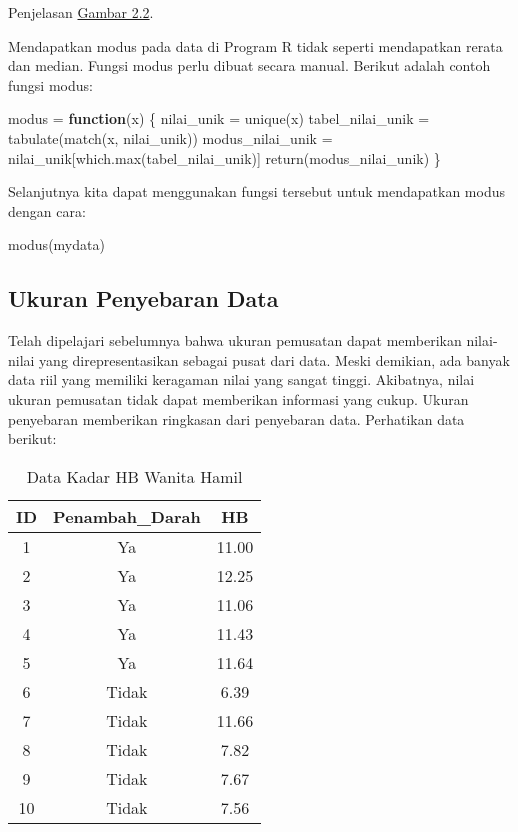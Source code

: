 \documentclass[
]{book}
\newenvironment{Shaded}{\begin{snugshade}}{\end{snugshade}}
\newcommand{\ControlFlowTok}[1]{\textcolor[rgb]{0.13,0.29,0.53}{\textbf{#1}}}
\newcommand{\FunctionTok}[1]{\textcolor[rgb]{0.00,0.00,0.00}{#1}}
\newcommand{\NormalTok}[1]{#1}
\newcommand{\OtherTok}[1]{\textcolor[rgb]{0.56,0.35,0.01}{#1}}
\begin{document}
Penjelasan \href{fig:a2-fig2}{Gambar 2.2}.

Mendapatkan modus pada data di Program R tidak seperti mendapatkan rerata dan median. Fungsi modus perlu dibuat secara manual. Berikut adalah contoh fungsi modus:

\begin{Shaded}
\begin{Highlighting}[]
\NormalTok{modus }\OtherTok{=} \ControlFlowTok{function}\NormalTok{(x) \{}
\NormalTok{  nilai\_unik }\OtherTok{=} \FunctionTok{unique}\NormalTok{(x)}
\NormalTok{  tabel\_nilai\_unik }\OtherTok{=} \FunctionTok{tabulate}\NormalTok{(}\FunctionTok{match}\NormalTok{(x, nilai\_unik))}
\NormalTok{  modus\_nilai\_unik }\OtherTok{=}\NormalTok{ nilai\_unik[}\FunctionTok{which.max}\NormalTok{(tabel\_nilai\_unik)]}
  \FunctionTok{return}\NormalTok{(modus\_nilai\_unik)}
\NormalTok{\}}
\end{Highlighting}
\end{Shaded}

Selanjutnya kita dapat menggunakan fungsi tersebut untuk mendapatkan modus dengan cara:

\begin{Shaded}
\begin{Highlighting}[]
\FunctionTok{modus}\NormalTok{(mydata)}
\end{Highlighting}
\end{Shaded}

\hypertarget{ukuran-penyebaran-data}{%
\subsection{Ukuran Penyebaran Data}\label{ukuran-penyebaran-data}}

Telah dipelajari sebelumnya bahwa ukuran pemusatan dapat memberikan nilai-nilai yang direpresentasikan sebagai pusat dari data. Meski demikian, ada banyak data riil yang memiliki keragaman nilai yang sangat tinggi. Akibatnya, nilai ukuran pemusatan tidak dapat memberikan informasi yang cukup. Ukuran penyebaran memberikan ringkasan dari penyebaran data. Perhatikan data berikut:

\begin{table}

\caption{\label{tab:a2-tab1}Data Kadar HB Wanita Hamil}
\centering
\begin{tabular}[t]{c|c|c}
\hline
ID & Penambah\_Darah & HB\\
\hline
1 & Ya & 11.00\\
\hline
2 & Ya & 12.25\\
\hline
3 & Ya & 11.06\\
\hline
4 & Ya & 11.43\\
\hline
5 & Ya & 11.64\\
\hline
6 & Tidak & 6.39\\
\hline
7 & Tidak & 11.66\\
\hline
8 & Tidak & 7.82\\
\hline
9 & Tidak & 7.67\\
\hline
10 & Tidak & 7.56\\
\hline
\end{tabular}
\end{table}
\end{document}
